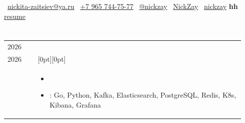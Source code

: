 \documentclass[10pt]{article}
\makeatletter
\newif\ifen
\newif\ifru
\newcommand{\en}[1]{\ifen#1\fi}
\newcommand{\ru}[1]{\ifru#1\fi}
\newcommand{\dates}[2]{\footnotesize #2\\[-1pt]\footnotesize #1}
\newcommand{\workentry}[3]{
\begin{tabular}{@{}p{0.125\linewidth}|p{0.82\linewidth}@{}}
\raggedleft #1 & \raisebox{-1.5pt}[0pt][0pt]{\textbf{#2}} \\[-12pt]
& #3
\end{tabular}\vspace{1mm}
}
\makeatother
\begin{document}
\begin{center}
    {\Huge \textbf{\ru{Никита Зайцев}}}
\end{center}

\begin{center}
\small
\faEnvelope\ \href{mailto:nickita-zaitsiev@ya.ru}{nickita-zaitsiev@ya.ru}
\hspace{1cm}
\faPhone\ \href{tel:+79657447577}{+7 965 744-75-77}
\hspace{1cm}
\faPaperPlane\ \href{https://t.me/nickzay}{@nickzay}
\hspace{1cm}
\faGithub\ \href{https://github.com/NickZay}{NickZay}
\hspace{1cm}
\faLinkedin\ \href{https://www.linkedin.com/in/nickzay}{nickzay}
\hspace{1cm}
\textbf{hh} \href{https://hh.ru/resume/e86c2e50ff0bf0d5320039ed1f686758497349}{resume}
\end{center}

\vspace{-4mm}
\section{\ru{О себе}}

\ru{Аналитик данных с сильным инженерным бэкграундом и более чем четырьмя годами опыта в продуктовых системах Ozon, Яндекса и Сбера. Уверенно работаю с Python, SQL, витринами и большими данными. Понимаю путь данных от источника до аналитики, умею исследовать продуктовые метрики, находить узкие места и автоматизировать расчёты. Рассматриваю позиции data- и продуктового аналитика.}
\en{Data Analyst with a strong engineering background and more than four years of experience with product systems at Ozon, Yandex, and Sber. I work confidently with Python, SQL, data marts, and large-scale data. I understand the data path from source to analytics, can investigate product metrics, identify bottlenecks, and automate calculations. I am considering Data Analyst and Product Analyst positions.}

\vspace{-2mm}
\section{\ru{Опыт работы}}

\workentry
{\dates{\ru{Июнь}\en{June} 2026}{\ru{Август}\en{August} 2026}}
{\ru{Ozon.ru --- Go-разработчик}\en{Ozon.ru --- Go Developer}}
{
\begin{itemize}
    \item \ru{Разрабатывал backend-сервисы и интеграции e-commerce-платформы, работал с потоками событий, хранилищами, метриками и логами}
          \en{Developed backend services and integrations for an e-commerce platform, working with event streams, storage systems, metrics, and logs}
    \item \ru{Стек}\en{Stack}: Go, Python, Kafka, Elasticsearch, PostgreSQL, Redis, K8s, Kibana, Grafana
\end{itemize}
}
\end{document}
